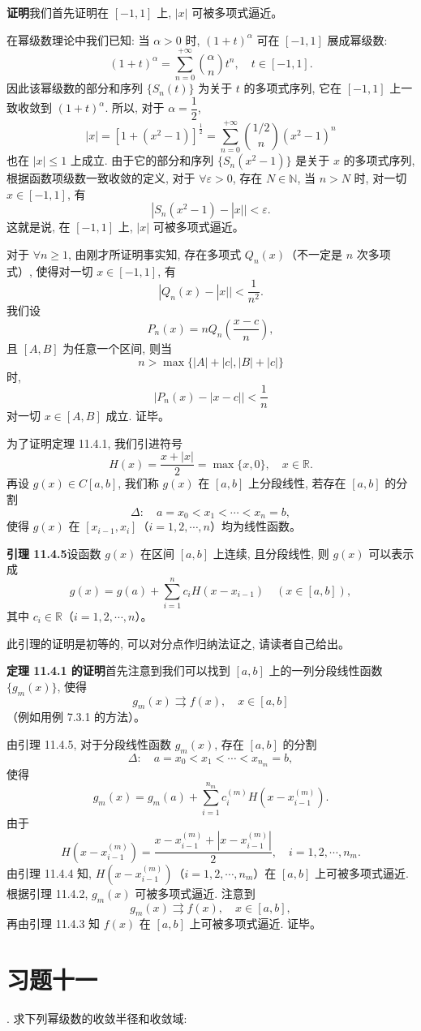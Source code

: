 \documentclass[UTF8, 12pt, fontset=fandol, oneside]{ctexart}
\begin{document}
\noindent\textbf{证明}\quad 我们首先证明在 $[-1,1]$ 上, $|x|$ 可被多项式逼近。

在幂级数理论中我们已知: 当 $\alpha>0$ 时, $(1+t)^\alpha$ 可在 $[-1,1]$ 展成幂级数:
\[
  (1+t)^\alpha=\sum_{n=0}^{+\infty}\binom{\alpha}{n}t^n,
  \quad t\in[-1,1].
\]
因此该幂级数的部分和序列 $\{S_n(t)\}$ 为关于 $t$ 的多项式序列, 它在 $[-1,1]$ 上一致收敛到 $(1+t)^\alpha$. 所以, 对于 $\alpha=\dfrac12$,
\[
  |x|
  =
  [1+(x^2-1)]^{\frac12}
  =
  \sum_{n=0}^{+\infty}\binom{1/2}{n}(x^2-1)^n
\]
也在 $|x|\leqslant1$ 上成立. 由于它的部分和序列 $\{S_n(x^2-1)\}$ 是关于 $x$ 的多项式序列, 根据函数项级数一致收敛的定义, 对于 $\forall\varepsilon>0$, 存在 $N\in\mathbb N$, 当 $n>N$ 时, 对一切 $x\in[-1,1]$, 有
\[
  |S_n(x^2-1)-|x||<\varepsilon.
\]
这就是说, 在 $[-1,1]$ 上, $|x|$ 可被多项式逼近。

对于 $\forall n\geqslant1$, 由刚才所证明事实知, 存在多项式 $Q_n(x)$（不一定是 $n$ 次多项式）, 使得对一切 $x\in[-1,1]$, 有
\[
  |Q_n(x)-|x||<\frac1{n^2}.
\]
我们设
\[
  P_n(x)=nQ_n\left(\frac{x-c}{n}\right),
\]
且 $[A,B]$ 为任意一个区间, 则当
\[
  n>\max\{|A|+|c|,|B|+|c|\}
\]
时,
\[
  |P_n(x)-|x-c||<\frac1n
\]
对一切 $x\in[A,B]$ 成立. 证毕。

为了证明定理 11.4.1, 我们引进符号
\[
  H(x)=\frac{x+|x|}{2}=\max\{x,0\},\quad x\in\mathbb R.
\]
再设 $g(x)\in C[a,b]$, 我们称 $g(x)$ 在 $[a,b]$ 上分段线性, 若存在 $[a,b]$ 的分割
\[
  \Delta:\quad a=x_0<x_1<\cdots<x_n=b,
\]
使得 $g(x)$ 在 $[x_{i-1},x_i]$（$i=1,2,\cdots,n$）均为线性函数。

\noindent\textbf{引理 11.4.5}\quad 设函数 $g(x)$ 在区间 $[a,b]$ 上连续, 且分段线性, 则 $g(x)$ 可以表示成
\[
  g(x)=g(a)+\sum_{i=1}^{n}c_iH(x-x_{i-1})
  \quad(x\in[a,b]),
\]
其中 $c_i\in\mathbb R$（$i=1,2,\cdots,n$）。

此引理的证明是初等的, 可以对分点作归纳法证之, 请读者自己给出。

\noindent\textbf{定理 11.4.1 的证明}\quad 首先注意到我们可以找到 $[a,b]$ 上的一列分段线性函数 $\{g_m(x)\}$, 使得
\[
  g_m(x)\rightrightarrows f(x),\quad x\in[a,b]
\]
（例如用例 7.3.1 的方法）。

由引理 11.4.5, 对于分段线性函数 $g_m(x)$, 存在 $[a,b]$ 的分割
\[
  \Delta:\quad a=x_0<x_1<\cdots<x_{n_m}=b,
\]
使得
\[
  g_m(x)=g_m(a)+\sum_{i=1}^{n_m}c_i^{(m)}H(x-x_{i-1}^{(m)}).
\]
由于
\[
  H(x-x_{i-1}^{(m)})
  =
  \frac{x-x_{i-1}^{(m)}+|x-x_{i-1}^{(m)}|}{2},
  \quad i=1,2,\cdots,n_m.
\]
由引理 11.4.4 知, $H(x-x_{i-1}^{(m)})$（$i=1,2,\cdots,n_m$）在 $[a,b]$ 上可被多项式逼近. 根据引理 11.4.2, $g_m(x)$ 可被多项式逼近. 注意到
\[
  g_m(x)\rightrightarrows f(x),\quad x\in[a,b],
\]
再由引理 11.4.3 知 $f(x)$ 在 $[a,b]$ 上可被多项式逼近. 证毕。

\section*{习题十一}

. 求下列幂级数的收敛半径和收敛域:
\end{document}
